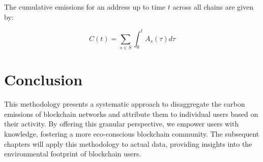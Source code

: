 \documentclass[12pt,a4paper]{report}
\begin{document}
The cumulative emissions for an address up to time \( t \) across all chains are given by:

\[ C(t) = \sum_{s \in S} \int_{0}^{t} A_s(\tau) d\tau \]

\section{Conclusion}

This methodology presents a systematic approach to disaggregate the carbon emissions of blockchain networks and attribute them to individual users based on their activity. By offering this granular perspective, we empower users with knowledge, fostering a more eco-conscious blockchain community. The subsequent chapters will apply this methodology to actual data, providing insights into the environmental footprint of blockchain users.
\end{document}

